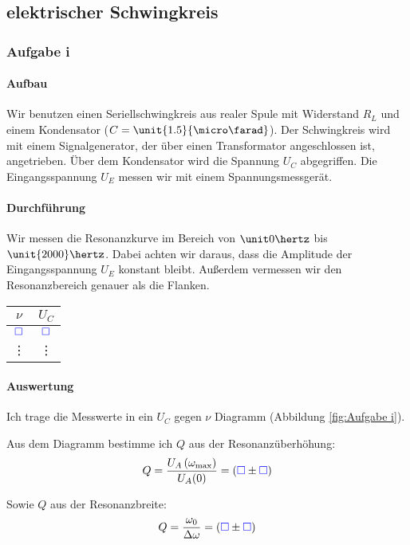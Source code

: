 \documentclass[11pt, ngerman]{article}
\newcommand{\emesswert}{\left(\messwert \pm \messwert \right)}
\newcommand{\messwert}{\textcolor{blue}{\square}}
\begin{document}
\subsection{elektrischer Schwingkreis}

\subsubsection{Aufgabe i}

\paragraph{Aufbau}

Wir benutzen einen Seriellschwingkreis aus realer Spule mit Widerstand $R_L$
und einem Kondensator ($C = \unit{1.5}{\micro\farad}$). Der Schwingkreis wird
mit einem Signalgenerator, der über einen Transformator angeschlossen ist,
angetrieben. Über dem Kondensator wird die Spannung $U_C$ abgegriffen. Die
Eingangsspannung $U_E$ messen wir mit einem Spannungsmessgerät.

\paragraph{Durchführung}

Wir messen die Resonanzkurve im Bereich von $\unit0\hertz$ bis
$\unit{2000}\hertz$. Dabei achten wir daraus, dass die Amplitude der
Eingangsspannung $U_E$ konstant bleibt. Außerdem vermessen wir den Resonanzbereich genauer als die Flanken.

\begin{table}[h!]
	\centering
	\begin{tabular}{cc}
		$\nu$ & $U_C$ \\
		\hline
		$\messwert$ & $\messwert$ \\
				\vdots & \vdots
	\end{tabular}
\end{table}

\paragraph{Auswertung}

Ich trage die Messwerte in ein $U_C$ gegen $\nu$ Diagramm (Abbildung \ref{fig:Aufgabe i}).

Aus dem Diagramm bestimme ich $Q$ aus der Resonanzüberhöhung:
\[
	Q = \frac{U_A\del{\omega_\text{max}}}{U_A(0)} = \emesswert
\]

Sowie $Q$ aus der Resonanzbreite:
\[
	Q = \frac{\omega_0}{\Delta \omega} = \emesswert
\]
\end{document}
